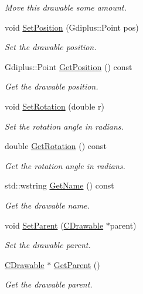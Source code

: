 \begin{DoxyCompactItemize}
\begin{DoxyCompactList}\small\item\em Move this drawable some amount. \end{DoxyCompactList}\item 
void \hyperlink{class_c_drawable_aa6b8988df847a76c30dfcf525ab65449}{Set\+Position} (Gdiplus\+::\+Point pos)
\begin{DoxyCompactList}\small\item\em Set the drawable position. \end{DoxyCompactList}\item 
Gdiplus\+::\+Point \hyperlink{class_c_drawable_ac1def1d34d8069e3985e3a423ba80f2d}{Get\+Position} () const 
\begin{DoxyCompactList}\small\item\em Get the drawable position. \end{DoxyCompactList}\item 
void \hyperlink{class_c_drawable_ab1191ba99b869690839ff20cd0cc45c4}{Set\+Rotation} (double r)
\begin{DoxyCompactList}\small\item\em Set the rotation angle in radians. \end{DoxyCompactList}\item 
double \hyperlink{class_c_drawable_afb31912cfe47cc336dfbef384181ca65}{Get\+Rotation} () const 
\begin{DoxyCompactList}\small\item\em Get the rotation angle in radians. \end{DoxyCompactList}\item 
std\+::wstring \hyperlink{class_c_drawable_a45af045c285cd0be9340a9a0d9883260}{Get\+Name} () const 
\begin{DoxyCompactList}\small\item\em Get the drawable name. \end{DoxyCompactList}\item 
void \hyperlink{class_c_drawable_ad53fc2430248f2ac022ab142024df983}{Set\+Parent} (\hyperlink{class_c_drawable}{C\+Drawable} $\ast$parent)
\begin{DoxyCompactList}\small\item\em Set the drawable parent. \end{DoxyCompactList}\item 
\hyperlink{class_c_drawable}{C\+Drawable} $\ast$ \hyperlink{class_c_drawable_a7f71959d8c597e34abb395b6dece5ad6}{Get\+Parent} ()
\begin{DoxyCompactList}\small\item\em Get the drawable parent. \end{DoxyCompactList}\item 

\end{DoxyCompactItemize}
